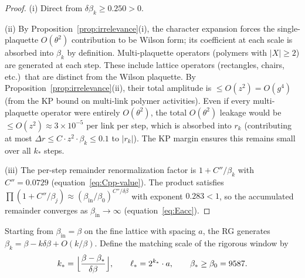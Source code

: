 \documentclass[11pt]{article}
\theoremstyle{definition}
\begin{document}
\begin{proof}
(i) Direct from $\delta\beta_k\ge 0.250>0$.

(ii) By Proposition~\ref{prop:irrelevance}(i), the character
expansion forces the single-plaquette $O(\theta^2)$ contribution
to be Wilson form; its coefficient at each scale is absorbed
into $\beta_k$ by definition.  Multi-plaquette operators
(polymers with $|X|\ge 2$) are generated at each step.
These include lattice operators (rectangles, chairs, etc.)\
that are distinct from the Wilson plaquette.
By Proposition~\ref{prop:irrelevance}(ii), their total
amplitude is $\le O(z^2)=O(g^4)$ (from the KP bound on
multi-link polymer activities).  Even if every
multi-plaquette operator were entirely $O(\theta^2)$, the
total $O(\theta^2)$ leakage would be
$\le O(z^2)\approx 3\times 10^{-5}$ per link per step,
which is absorbed into $r_k$ (contributing at most
$\Delta r\le C\cdot z^2\cdot\beta_k\le 0.1$ to $|r_k|$).
The KP margin ensures this remains small over all $k_*$ steps.

(iii) The per-step remainder renormalization
factor is $1+C''/\beta_k$ with $C''=0.0729$
(equation~\eqref{eq:Cpp-value}).  The product satisfies
$\prod(1+C''/\beta_j)
\approx(\beta_{\mathrm{in}}/\beta_0)^{C''/\delta\beta}$
with exponent $0.283<1$, so the accumulated remainder
converges as $\beta_{\mathrm{in}}\to\infty$
(equation~\eqref{eq:Eacc}).
\end{proof}

Starting from $\beta_{\mathrm{in}}=\beta$ on the fine lattice with spacing $a$,
the RG generates $\beta_k=\beta-k\delta\beta+O(k/\beta)$.  Define the
matching scale of the rigorous window by
\begin{equation}\label{eq:kstar-rigorous}
k_*=\Bigl\lfloor\frac{\beta-\beta_*}{\delta\beta}\Bigr\rfloor,
\qquad\ell_*=2^{k_*}\cdot a,
\qquad\beta_*\ge\beta_0=9587.
\end{equation}
\end{document}

